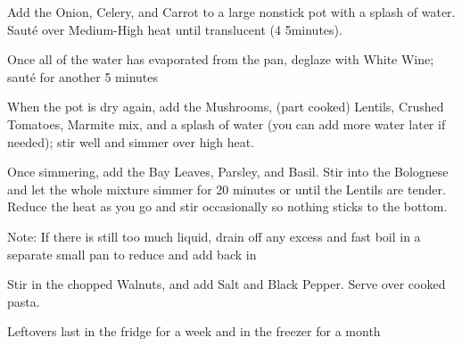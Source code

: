 \begin{method}
Add the Onion, Celery, and Carrot to a large nonstick pot with a
splash of water. Sauté over Medium-High heat until translucent (4
5minutes).

Once all of the water has evaporated from the pan, deglaze with
White Wine; sauté for another 5 minutes

When the pot is dry again, add the Mushrooms, (part cooked) Lentils,
Crushed Tomatoes, Marmite mix, and a splash of water (you can add
more water later if needed); stir well and simmer over high heat.

Once simmering, add the Bay Leaves, Parsley, and Basil. Stir into the
Bolognese and let the whole mixture simmer for 20 minutes or until the
Lentils are tender. Reduce the heat as you go and stir occasionally so
nothing sticks to the bottom.

Note: If there is still too much liquid, drain off any excess and fast
boil in a separate small pan to reduce and add back in

Stir in the chopped Walnuts, and add Salt and Black Pepper. Serve
over cooked pasta.

\end{method}


\begin{notes}
Leftovers last in the fridge for a week and in the freezer for a month
\end{notes}

